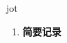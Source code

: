 
\begin{frame}
{\huge jot}
\begin{center}
\begin{enumerate}\Large
  \item \textbf{简要记录}
\end{enumerate}
\end{center}
\end{frame}
